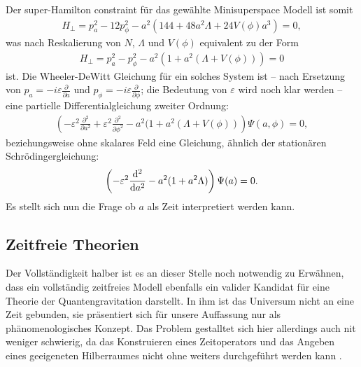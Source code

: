\documentclass{scrartcl}
\newcommand{\veps}{\varepsilon}
\begin{document}
			Der super-Hamilton constraint für das gewählte Minisuperspace Modell ist somit
			\begin{align}
				H_\perp=p_a^2-12p_\phi^2-a^2(144+48 a^2 \Lambda+24V(\phi)a^3)=0,
			\end{align}
			was nach Reskalierung von $N$, $\Lambda$ und $V(\phi)$ equivalent zu der Form
			\begin{align}
				H_\perp=p_a^2-p_\phi^2-a^2(1+a^2 (\Lambda+V(\phi)))=0
			\end{align}
			ist. Die Wheeler-DeWitt Gleichung für ein solches System ist -- nach Ersetzung von $p_a=-i\veps\frac{\partial}{\partial a}$ und $p_\phi=-i\veps\frac{\partial}{\partial \phi}$; die Bedeutung von $\veps$ wird noch klar werden -- eine
			partielle Differentialgleichung zweiter Ordnung:
			\begin{align}
				\left(-\veps^2\frac{\partial^2}{\partial a^2}+\veps^2\frac{\partial^2}{\partial \phi^2}-a^2(1+a^2 (\Lambda+V(\phi))\right)\Psi(a,\phi)=0,
			\end{align}
			beziehungsweise ohne skalares Feld eine Gleichung, ähnlich der stationären Schrödingergleichung:
			\begin{align}
				\left(-\veps^2\frac{{\rm d}^2}{{\rm d}a^2}-a^2(1+a^2\Lambda)\right)\Psi(a)=0.
			\end{align}
			Es stellt sich nun die Frage ob $a$ als Zeit interpretiert werden kann. 
		\subsection{Zeitfreie Theorien}
			Der Vollständigkeit halber ist es an dieser Stelle noch notwendig zu Erwähnen,
			dass ein vollständig zeitfreies Modell ebenfalls ein valider Kandidat für eine Theorie der Quantengravitation darstellt. In ihm ist das Universum
			nicht an eine Zeit gebunden, sie präsentiert sich für unsere Auffassung nur als phänomenologisches 
			Konzept. Das Problem gestalltet sich hier allerdings auch nit weniger schwierig,
			da das Konstruieren eines Zeitoperators und das Angeben eines geeigeneten Hilberraumes nicht
			ohne weiters durchgeführt werden kann \cite{qg06}.
	{}
	
\end{document}
